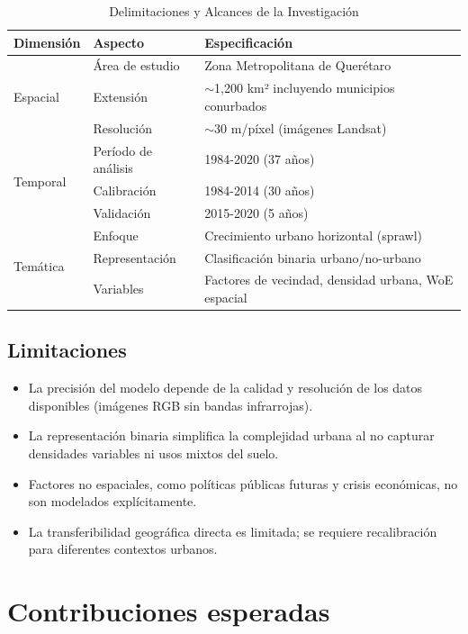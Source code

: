 \begin{table}[htbp]
\centering
\caption{Delimitaciones y Alcances de la Investigación}
\label{tab:scope}
\begin{tabular}{llp{7cm}}
\toprule
\textbf{Dimensión} & \textbf{Aspecto} & \textbf{Especificación} \\
\midrule
\multirow{3}{*}{Espacial} & Área de estudio & Zona Metropolitana de Querétaro \\
 & Extensión & $\sim$1{,}200 km² incluyendo municipios conurbados \\
 & Resolución & $\sim$30 m/píxel (imágenes Landsat) \\
\midrule
\multirow{3}{*}{Temporal} & Período de análisis & 1984-2020 (37 años) \\
 & Calibración & 1984-2014 (30 años) \\
 & Validación & 2015-2020 (5 años) \\
\midrule
\multirow{3}{*}{Temática} & Enfoque & Crecimiento urbano horizontal (sprawl) \\
 & Representación & Clasificación binaria urbano/no-urbano \\
 & Variables & Factores de vecindad, densidad urbana, WoE espacial \\
\bottomrule
\end{tabular}
\end{table}

\subsection{Limitaciones}

\begin{itemize}
	\item La precisión del modelo depende de la calidad y resolución de los datos disponibles (imágenes RGB sin bandas infrarrojas).
	\item La representación binaria simplifica la complejidad urbana al no capturar densidades variables ni usos mixtos del suelo.
	\item Factores no espaciales, como políticas públicas futuras y crisis económicas, no son modelados explícitamente.
	\item La transferibilidad geográfica directa es limitada; se requiere recalibración para diferentes contextos urbanos.
\end{itemize}

\section{Contribuciones esperadas}

